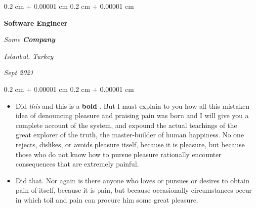 \documentclass[10pt, letterpaper]{article}
\newenvironment{highlights}{
    \begin{itemize}[
        topsep=0.10 cm,
        parsep=0.10 cm,
        partopsep=0pt,
        itemsep=0pt,
        leftmargin=0.4 cm + 10pt
    ]
}{
    \end{itemize}
} %
\newenvironment{onecolentry}{
    \begin{adjustwidth}{
        0.2 cm + 0.00001 cm
    }{
        0.2 cm + 0.00001 cm
    }
}{
    \end{adjustwidth}
} %
\newenvironment{twocolentry}[2][]{
    \onecolentry
    \def\secondColumn{#2}
    \setcolumnwidth{\fill, 4.5 cm}
    \begin{paracol}{2}
}{
    \switchcolumn \raggedleft \secondColumn
    \end{paracol}
    \endonecolentry
} %
\let\hrefWithoutArrow\href
\renewcommand{\href}[2]{\hrefWithoutArrow{#1}{\ifthenelse{\equal{#2}{}}{ }{#2 }\raisebox{.15ex}{\footnotesize \faExternalLink*}}}
\begin{document}
        \begin{twocolentry}{
        \textit{Istanbul, Turkey}    
            
        \textit{Sept 2021}}
            \textbf{Software Engineer}
            
            \textit{Some \textbf{Company}}
        \end{twocolentry}
        \vspace{0.10 cm}
        \begin{onecolentry}
            \begin{highlights}
                \item Did \textit{this} and this is a \textbf{bold} \href{https://example.com}{link}. But I must explain to you how all this mistaken idea of denouncing pleasure and praising pain was born and I will give you a complete account of the system, and expound the actual teachings of the great explorer of the truth, the master-builder of human happiness. No one rejects, dislikes, or avoids pleasure itself, because it is pleasure, but because those who do not know how to pursue pleasure rationally encounter consequences that are extremely painful.
                \item Did that. Nor again is there anyone who loves or pursues or desires to obtain pain of itself, because it is pain, but because occasionally circumstances occur in which toil and pain can procure him some great pleasure.
            \end{highlights}
        \end{onecolentry}


        \vspace{0.2 cm}
\end{document}
